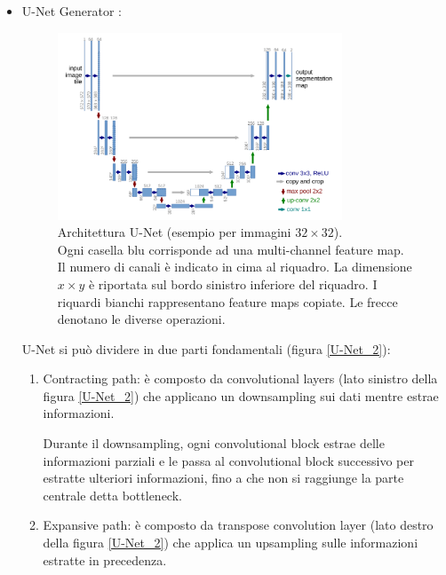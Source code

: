             \begin{itemize}
                \item U-Net Generator %
                      \cite{ronneberger2015u}:
                    \begin{figure}[!h]
                        \centering \includegraphics[width=0.8\textwidth]{Images/Mitigation/U-Net_1.png}
                        \caption{Architettura U-Net (esempio per immagini $32\times32$). \\
                        Ogni casella blu corrisponde ad una multi-channel feature map. Il numero di canali è indicato in cima al riquadro. La dimensione $x\times y$ è riportata sul bordo sinistro inferiore del riquadro.
                        I riquardi bianchi rappresentano feature maps copiate. 
                        Le frecce denotano le diverse operazioni.}
                        \label{U-Net_1}
                    \end{figure}
                \newpage
                
                U-Net si può dividere in due parti fondamentali (figura \ref{U-Net_2}):
                    \begin{enumerate}
                        \item Contracting path: è composto da convolutional layers (lato sinistro della figura \ref{U-Net_2}) che applicano un downsampling sui dati mentre estrae informazioni.
                        
                        Durante il downsampling, ogni convolutional block estrae delle informazioni parziali e le passa al convolutional block successivo per estratte ulteriori informazioni, fino a che non si raggiunge la parte centrale detta bottleneck.
                        \item Expansive path: è composto da transpose convolution layer (lato destro della figura \ref{U-Net_2}) che applica un upsampling sulle informazioni estratte in precedenza.
                        

\end{enumerate}
\end{itemize}
